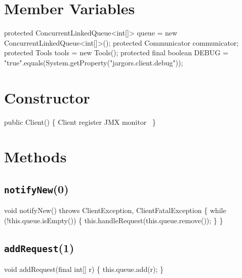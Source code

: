 \section{Member Variables}
\nwenddocs{}\plusendmoddef
protected ConcurrentLinkedQueue<int[]> queue = new ConcurrentLinkedQueue<int[]>();
protected Communicator communicator;
protected Tools tools = new Tools();
protected final boolean DEBUG =
    "true".equals(System.getProperty("jargors.client.debug"));
\nwendcode{}\nwdocspar
\section{Constructor}
\nwenddocs{}\endmoddef{}
public Client() \{
  \LA{}\code{}Client\edoc{} register JMX monitor~{\nwtagstyle{}}\RA{}
\}
\nwendcode{}\nwdocspar

\section{Methods}

\subsection{\texttt{notifyNew}(0)}
\nwenddocs{}\endmoddef{}
void notifyNew() throws ClientException, ClientFatalException \{
  while (!this.queue.isEmpty()) \{
    this.handleRequest(this.queue.remove());
  \}
\}
\eatline
{}\nwendcode{}\nwdocspar
\subsection{\texttt{addRequest}(1)}
\nwenddocs{}\endmoddef{}
void addRequest(final int[] r) \{
  this.queue.add(r);
\}
\eatline
{}\nwendcode{}\nwdocspar
